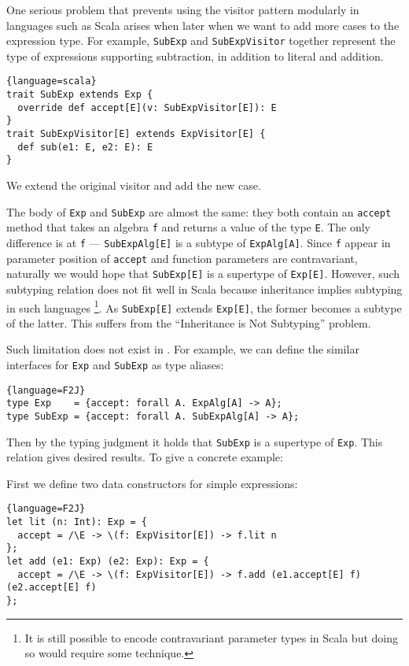 One serious problem that prevents using the visitor pattern modularly in
languages such as Scala arises when later when we want to add more cases to the
expression type. For example, \lstinline$SubExp$ and \lstinline$SubExpVisitor$
together represent the type of expressions supporting subtraction, in addition
to literal and addition.
\begin{lstlisting}{language=scala}
trait SubExp extends Exp {
  override def accept[E](v: SubExpVisitor[E]): E
}
trait SubExpVisitor[E] extends ExpVisitor[E] {
  def sub(e1: E, e2: E): E
}
\end{lstlisting}
We extend the original visitor and add the new case.

The body of \lstinline{Exp} and \lstinline{SubExp} are almost the same: they
both contain an \lstinline{accept} method that takes an algebra \lstinline{f}
and returns a value of the type \lstinline{E}. The only difference is at
\lstinline{f} --- \lstinline{SubExpAlg[E]} is a subtype of
\lstinline{ExpAlg[A]}. Since \lstinline{f} appear in parameter position of
\lstinline{accept} and function parameters are contravariant, naturally we would
hope that \lstinline{SubExp[E]} is a supertype of \lstinline{Exp[E]}. However,
such subtyping relation does not fit well in Scala because inheritance implies
subtyping in such languages \footnote{It is still possible to encode
  contravariant parameter types in Scala but doing so would require some
  technique.}. As \lstinline{SubExp[E]} extends
\lstinline{Exp[E]}, the former becomes a subtype of the latter. This suffers
from the ``Inheritance is Not Subtyping'' problem.

Such limitation does not exist in \name. For example, we can define the similar
interfaces for \lstinline{Exp} and \lstinline{SubExp} as type aliases:
\begin{lstlisting}{language=F2J}
type Exp    = {accept: forall A. ExpAlg[A] -> A};
type SubExp = {accept: forall A. SubExpAlg[A] -> A};
\end{lstlisting}
Then by the typing judgment it holds that \lstinline{SubExp} is a supertype of
\lstinline{Exp}. This relation gives desired results. To give a concrete
example:

First we define two data constructors for simple expressions:
\begin{lstlisting}{language=F2J}
let lit (n: Int): Exp = {
  accept = /\E -> \(f: ExpVisitor[E]) -> f.lit n
};
let add (e1: Exp) (e2: Exp): Exp = {
  accept = /\E -> \(f: ExpVisitor[E]) -> f.add (e1.accept[E] f) (e2.accept[E] f)
};
\end{lstlisting}

